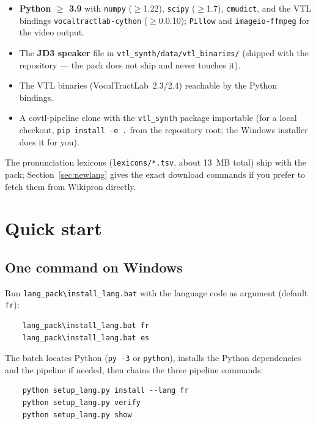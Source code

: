 \documentclass[11pt,a4paper]{article}
\newcommand{\code}[1]{\texttt{#1}}
\begin{document}
\begin{itemize}
\item \textbf{Python $\geq$ 3.9} with \code{numpy} ($\geq$1.22),
      \code{scipy} ($\geq$1.7), \code{cmudict}, and the VTL bindings
      \code{vocaltractlab-cython} ($\geq$0.0.10);
      \code{Pillow} and \code{imageio-ffmpeg} for the video output.
\item The \textbf{JD3 speaker} file in
      \code{vtl\_synth/data/vtl\_binaries/} (shipped with the
      repository --- the pack does not ship and never touches it).
\item The VTL binaries (VocalTractLab~2.3/2.4) reachable by the
      Python bindings.
\item A covtl-pipeline clone with the \code{vtl\_synth} package
      importable (for a local checkout, \code{pip install -e .} from
      the repository root; the Windows installer does it for you).
\end{itemize}

The pronunciation lexicons (\code{lexicons/*.tsv}, about 13~MB
total) ship with the pack; Section~\ref{sec:newlang} gives the exact
download commands if you prefer to fetch them from Wikipron directly.

\section{Quick start}

\subsection{One command on Windows}

Run \code{lang\_pack\textbackslash install\_lang.bat} with the
language code as argument (default \code{fr}):

\begin{verbatim}
    lang_pack\install_lang.bat fr
    lang_pack\install_lang.bat es
\end{verbatim}

The batch locates Python (\code{py -3} or \code{python}), installs
the Python dependencies and the pipeline if needed, then chains the
three pipeline commands:

\begin{verbatim}
    python setup_lang.py install --lang fr
    python setup_lang.py verify
    python setup_lang.py show
\end{verbatim}
\end{document}
